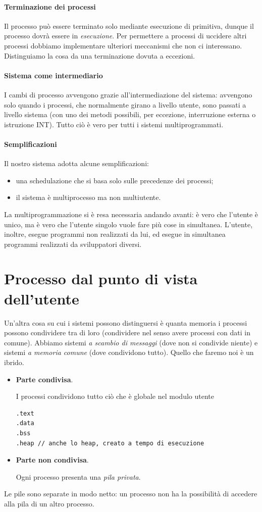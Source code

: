 \documentclass[11pt]{report}
\theoremstyle{definition}
\begin{document}
\paragraph{Terminazione dei processi} Il processo può essere terminato solo mediante esecuzione di primitiva, dunque il processo dovrà essere in \emph{esecuzione}. Per permettere a processi di uccidere altri processi dobbiamo implementare ulteriori meccanismi che non ci interessano. Distinguiamo la cosa da una terminazione dovuta a eccezioni.

\paragraph{Sistema come intermediario} I cambi di processo avvengono grazie all'intermediazione del sistema: avvengono solo quando i processi, che normalmente girano a livello utente, sono passati a livello sistema (con uno dei metodi possibili, per eccezione, interruzione esterna o istruzione INT). Tutto ciò è vero per tutti i sistemi multiprogrammati. 

\paragraph{Semplificazioni} Il nostro sistema adotta alcune semplificazioni:
\begin{itemize}
\item una schedulazione che si basa solo sulle precedenze dei processi;
\item il sistema è multiprocesso ma non multiutente.
\end{itemize}
La multiprogrammazione si è resa necessaria andando avanti: è vero che l'utente è unico, ma è vero che l'utente singolo vuole fare più cose in simultanea. L'utente, inoltre, esegue programmi non realizzati da lui, ed esegue in simultanea programmi realizzati da sviluppatori diversi.
\clearpage 

\section{Processo dal punto di vista dell'utente}
Un'altra cosa su cui i sistemi possono distinguersi è quanta memoria i processi possono condividere tra di loro (condividere nel senso avere processi con dati in comune). Abbiamo sistemi \emph{a scambio di messaggi} (dove non si condivide niente) e sistemi \emph{a memoria comune} (dove condividono tutto). Quello che faremo noi è un ibrido.
\begin{itemize}
\item \textbf{Parte condivisa}. 

I processi condividono tutto ciò che è globale nel modulo utente
\begin{verbatim}
.text
.data
.bss
.heap // anche lo heap, creato a tempo di esecuzione
\end{verbatim}
\item \textbf{Parte non condivisa}.

Ogni processo presenta una \emph{pila privata}.
\end{itemize}
Le pile sono separate in modo netto: un processo non ha la possibilità di accedere alla pila di un altro processo.
\end{document}
